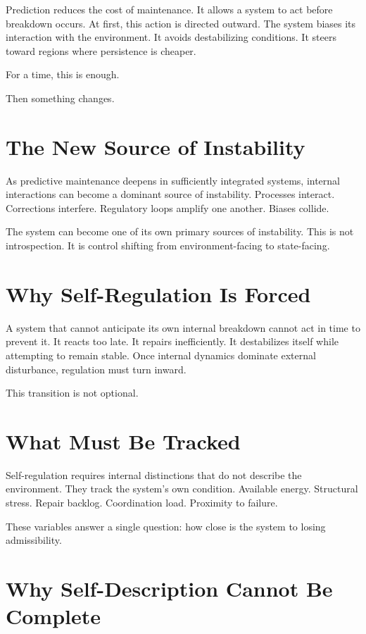 \documentclass[11pt,twoside,openright]{book}
\begin{document}
Prediction reduces the cost of maintenance. It allows a system to act before breakdown occurs. At first, this action is directed outward. The system biases its interaction with the environment. It avoids destabilizing conditions. It steers toward regions where persistence is cheaper.

For a time, this is enough.

Then something changes.

\section*{The New Source of Instability}

As predictive maintenance deepens in sufficiently integrated systems, internal interactions can become a dominant source of instability. Processes interact. Corrections interfere. Regulatory loops amplify one another. Biases collide.

The system can become one of its own primary sources of instability. This is not introspection. It is control shifting from environment-facing to state-facing.

\section*{Why Self-Regulation Is Forced}

A system that cannot anticipate its own internal breakdown cannot act in time to prevent it. It reacts too late. It repairs inefficiently. It destabilizes itself while attempting to remain stable. Once internal dynamics dominate external disturbance, regulation must turn inward.

This transition is not optional.

\section*{What Must Be Tracked}

Self-regulation requires internal distinctions that do not describe the environment. They track the system's own condition. Available energy. Structural stress. Repair backlog. Coordination load. Proximity to failure.

These variables answer a single question: how close is the system to losing admissibility.

\section*{Why Self-Description Cannot Be Complete}
\end{document}
